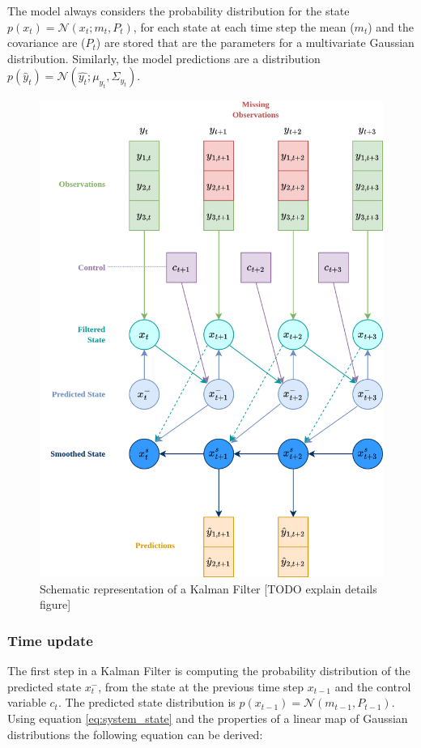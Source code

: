 \documentclass{article}
\newcommand{\norm}[3]{\mathcal{N}\left(#1; #2, #3\right)} %
\begin{document}
The model always considers the probability distribution for the state $p(x_t) = \norm{x_t}{m_t}{P_t}$, for each state at each time step the mean ($m_t$) and the covariance are ($P_t$) are stored that are the parameters for a multivariate Gaussian distribution. Similarly, the model predictions are a distribution $p(\hat{y}_t) =  \norm{\hat{y_t}}{\mu_{y_t}}{\Sigma_{y_t}}$.

\begin{figure}
\centerline{\includegraphics[width=4.5in]{Kalman Filter figure.png}}
\caption{Schematic representation of a Kalman Filter [TODO explain details figure]}
\label{fig:kalman_filter}
\end{figure}

\subsubsection{Time update}

The first step in a Kalman Filter is computing the probability distribution of the predicted state $x^-_t$, from the state at the previous time step $x_{t-1}$ and the control variable $c_t$. The predicted state distribution is $p(x_{t-1}) = \mathcal{N}(m_{t-1}, P_{t-1})$.  Using equation \ref{eq:system_state} and the properties of a linear map of Gaussian distributions the following equation can be derived:
\end{document}
